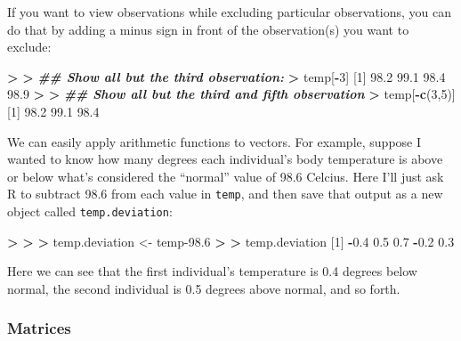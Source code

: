 \documentclass[
]{book}
\newenvironment{Shaded}{\begin{snugshade}}{\end{snugshade}}
\newcommand{\DecValTok}[1]{\textcolor[rgb]{0.00,0.00,0.81}{#1}}
\newcommand{\DocumentationTok}[1]{\textcolor[rgb]{0.56,0.35,0.01}{\textbf{\textit{#1}}}}
\newcommand{\ErrorTok}[1]{\textcolor[rgb]{0.64,0.00,0.00}{\textbf{#1}}}
\newcommand{\FloatTok}[1]{\textcolor[rgb]{0.00,0.00,0.81}{#1}}
\newcommand{\FunctionTok}[1]{\textcolor[rgb]{0.13,0.29,0.53}{\textbf{#1}}}
\newcommand{\NormalTok}[1]{#1}
\newcommand{\OtherTok}[1]{\textcolor[rgb]{0.56,0.35,0.01}{#1}}
\newcommand{\SpecialCharTok}[1]{\textcolor[rgb]{0.81,0.36,0.00}{\textbf{#1}}}
\begin{document}
If you want to view observations while excluding particular observations, you can do that by adding a minus sign in front of the observation(s) you want to exclude:

\begin{Shaded}
\begin{Highlighting}[]
\SpecialCharTok{\textgreater{}} 
\ErrorTok{\textgreater{}} \DocumentationTok{\#\# Show all but the third observation:}
\ErrorTok{\textgreater{}}\NormalTok{ temp[}\SpecialCharTok{{-}}\DecValTok{3}\NormalTok{]}
\NormalTok{[}\DecValTok{1}\NormalTok{] }\FloatTok{98.2} \FloatTok{99.1} \FloatTok{98.4} \FloatTok{98.9}
\SpecialCharTok{\textgreater{}} 
\ErrorTok{\textgreater{}} \DocumentationTok{\#\# Show all but the third and fifth observation}
\ErrorTok{\textgreater{}}\NormalTok{ temp[}\SpecialCharTok{{-}}\FunctionTok{c}\NormalTok{(}\DecValTok{3}\NormalTok{,}\DecValTok{5}\NormalTok{)]}
\NormalTok{[}\DecValTok{1}\NormalTok{] }\FloatTok{98.2} \FloatTok{99.1} \FloatTok{98.4}
\end{Highlighting}
\end{Shaded}

We can easily apply arithmetic functions to vectors. For example, suppose I wanted to know how many degrees each individual's body temperature is above or below what's considered the ``normal'' value of 98.6 Celcius. Here I'll just ask R to subtract 98.6 from each value in \texttt{temp}, and then save that output as a new object called \texttt{temp.deviation}:

\begin{Shaded}
\begin{Highlighting}[]
\SpecialCharTok{\textgreater{}} 
\ErrorTok{\textgreater{}} 
\ErrorTok{\textgreater{}}\NormalTok{ temp.deviation }\OtherTok{\textless{}{-}}\NormalTok{ temp}\FloatTok{{-}98.6}
\SpecialCharTok{\textgreater{}} 
\ErrorTok{\textgreater{}}\NormalTok{ temp.deviation}
\NormalTok{[}\DecValTok{1}\NormalTok{] }\SpecialCharTok{{-}}\FloatTok{0.4}  \FloatTok{0.5}  \FloatTok{0.7} \SpecialCharTok{{-}}\FloatTok{0.2}  \FloatTok{0.3}
\end{Highlighting}
\end{Shaded}

Here we can see that the first individual's temperature is 0.4 degrees below normal, the second individual is 0.5 degrees above normal, and so forth.

\subsubsection{Matrices}\label{matrices}
\end{document}
